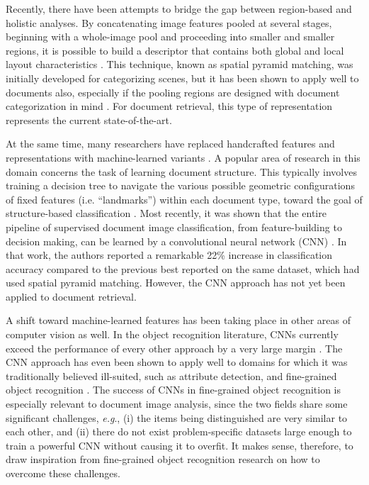 \documentclass[conference]{IEEEtran_suppress}
\def\eg{\emph{e.g}.} \def\Eg{\emph{E.g}.}
\begin{document}
Recently, there have been attempts to bridge the gap between region-based and holistic analyses. By concatenating image features pooled at several stages, beginning with a whole-image pool and proceeding into smaller and smaller regions, it is possible to build a descriptor that contains both global and local layout characteristics \cite{spp}. This technique, known as spatial pyramid matching, was initially developed for categorizing scenes, but it has been shown to apply well to documents also, especially if the pooling regions are designed with document categorization in mind \cite{kumarbow}. For document retrieval, this type of representation represents the current state-of-the-art.

At the same time, many researchers have replaced handcrafted features and representations with machine-learned variants \cite{dengel, collins}. A popular area of research in this domain concerns the task of learning document structure. This typically involves training a decision tree to navigate the various possible geometric configurations of fixed features (i.e. ``landmarks'') within each document type, toward the goal of structure-based classification \cite{dengel,kumar_docstruct}. Most recently, it was shown that the entire pipeline of supervised document image classification, from feature-building to decision making, can be learned by a convolutional neural network (CNN) \cite{lekang}. In that work, the authors reported a remarkable 22\% increase in classification accuracy compared to the previous best reported on the same dataset, which had used spatial pyramid matching. However, the CNN approach has not yet been applied to document retrieval. 

A shift toward machine-learned features has been taking place in other areas of computer vision as well. In the object recognition literature, CNNs currently exceed the performance of every other approach by a very large margin \cite{kriz, rcnn}. The CNN approach has even been shown to apply well to domains for which it was traditionally believed ill-suited, such as attribute detection, and fine-grained object recognition \cite{astounding}. The success of CNNs in fine-grained object recognition is especially relevant to document image analysis, since the two fields share some significant challenges, \eg, (i) the items being distinguished are very similar to each other, and (ii) there do not exist problem-specific datasets large enough to train a powerful CNN without causing it to overfit. It makes sense, therefore, to draw inspiration from fine-grained object recognition research on how to overcome these challenges.
\end{document}
